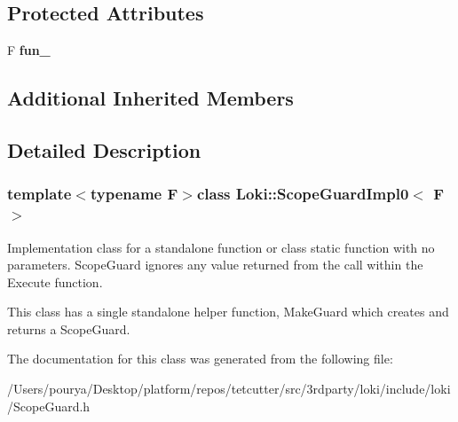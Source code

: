 \subsection*{Protected Attributes}
\begin{DoxyCompactItemize}
\item 
\hypertarget{classLoki_1_1ScopeGuardImpl0_ac46b42bde651675712fd6204b984d926}{}F {\bfseries fun\+\_\+}\label{classLoki_1_1ScopeGuardImpl0_ac46b42bde651675712fd6204b984d926}

\end{DoxyCompactItemize}
\subsection*{Additional Inherited Members}


\subsection{Detailed Description}
\subsubsection*{template$<$typename F$>$class Loki\+::\+Scope\+Guard\+Impl0$<$ F $>$}

Implementation class for a standalone function or class static function with no parameters. Scope\+Guard ignores any value returned from the call within the Execute function.

This class has a single standalone helper function, Make\+Guard which creates and returns a Scope\+Guard. 

The documentation for this class was generated from the following file\+:\begin{DoxyCompactItemize}
\item 
/\+Users/pourya/\+Desktop/platform/repos/tetcutter/src/3rdparty/loki/include/loki/Scope\+Guard.\+h\end{DoxyCompactItemize}
